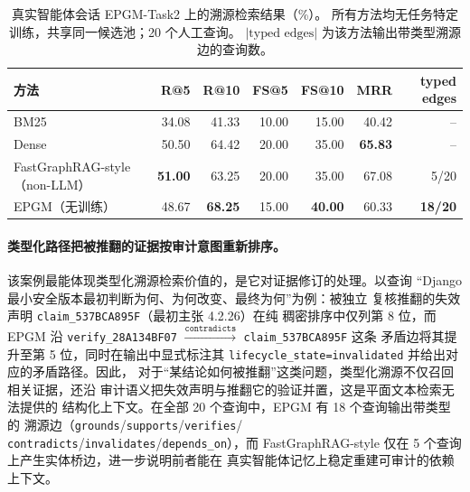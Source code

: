 \begin{table}[t]
\centering
\small
\setlength{\tabcolsep}{4pt}
\caption{真实智能体会话 EPGM-Task2 上的溯源检索结果（\%）。
所有方法均无任务特定训练，共享同一候选池；20 个人工查询。
$|\text{typed edges}|$ 为该方法输出带类型溯源边的查询数。}
\label{tab:epgm-case}
\begin{tabular}{lrrrrrr}
\hline
方法 & R@5 & R@10 & FS@5 & FS@10 & MRR & typed edges \\
\hline
BM25 & 34.08 & 41.33 & 10.00 & 15.00 & 40.42 & -- \\
Dense & 50.50 & 64.42 & 20.00 & 35.00 & \textbf{65.83} & -- \\
FastGraphRAG-style（non-LLM） & \textbf{51.00} & 63.25 & 20.00 & 35.00 & 67.08 & 5/20 \\
EPGM（无训练） & 48.67 & \textbf{68.25} & 15.00 & \textbf{40.00} & 60.33 & \textbf{18/20} \\
\hline
\end{tabular}
\end{table}

\paragraph{类型化路径把被推翻的证据按审计意图重新排序。}
该案例最能体现类型化溯源检索价值的，是它对证据修订的处理。以查询
“Django 最小安全版本最初判断为何、为何改变、最终为何”为例：被独立
复核推翻的失效声明 \texttt{claim\_537BCA895F}（最初主张 4.2.26）在纯
稠密排序中仅列第 8 位，而 EPGM 沿 \texttt{verify\_28A134BF07}
$\xrightarrow{\texttt{contradicts}}$ \texttt{claim\_537BCA895F} 这条
矛盾边将其提升至第 5 位，同时在输出中显式标注其
\texttt{lifecycle\_state=invalidated} 并给出对应的矛盾路径。因此，
对于“某结论如何被推翻”这类问题，类型化溯源不仅召回相关证据，还沿
审计语义把失效声明与推翻它的验证并置，这是平面文本检索无法提供的
结构化上下文。在全部 20 个查询中，EPGM 有 18 个查询输出带类型的
溯源边（\texttt{grounds}/\texttt{supports}/\texttt{verifies}/
\texttt{contradicts}/\texttt{invalidates}/\texttt{depends\_on}），而
FastGraphRAG-style 仅在 5 个查询上产生实体桥边，进一步说明前者能在
真实智能体记忆上稳定重建可审计的依赖上下文。

